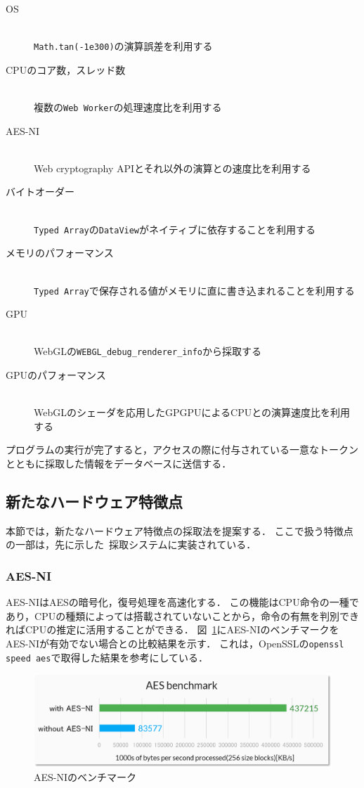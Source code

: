 \begin{description}
	\item[OS]\mbox{}\\
   	\texttt{Math.tan(-1e300)}の演算誤差を利用する~\cite{tor_mathtan}
    \item[CPUのコア数，スレッド数]\mbox{}\\
    複数の\texttt{Web Worker}の処理速度比を利用する~\cite{後藤浩行2013web,桐生直輝2014web}
    \item[AES-NI]\mbox{}\\
    Web cryptography APIとそれ以外の演算との速度比を利用する
    \item[バイトオーダー]\mbox{}\\
    \texttt{Typed Array}の\texttt{DataView}がネイティブに依存することを利用する
    \item[メモリのパフォーマンス]\mbox{}\\
    \texttt{Typed Array}で保存される値がメモリに直に書き込まれることを利用する
    \item[GPU]\mbox{}\\
    WebGLの\texttt{WEBGL\_debug\_renderer\_info}から採取する~\cite{mowery2012pixel}
    \item[GPUのパフォーマンス]\mbox{}\\
    WebGLのシェーダを応用したGPGPUによるCPUとの演算速度比を利用する
\end{description}

プログラムの実行が完了すると，アクセスの際に付与されている一意なトークンとともに採取した情報をデータベースに送信する．

\subsection{新たなハードウェア特徴点}
本節では，新たなハードウェア特徴点の採取法を提案する．
ここで扱う特徴点の一部は，先に示した\hfp~採取システムに実装されている．

\subsubsection{AES-NI}
AES-NIはAESの暗号化，復号処理を高速化する．
この機能はCPU命令の一種であり，CPUの種類によっては搭載されていないことから，命令の有無を判別できればCPUの推定に活用することができる．
図~\ref{fig-aes_ni}にAES-NIのベンチマークをAES-NIが有効でない場合との比較結果を示す．
これは，OpenSSLの\texttt{openssl speed aes}で取得した結果を参考にしている．

\begin{figure}[H]
	\centering
    \includegraphics[width=\textwidth,pagebox=artbox]{fig/aes_ni.png}
    \caption{AES-NIのベンチマーク}
    \label{fig-aes_ni}
\end{figure}

